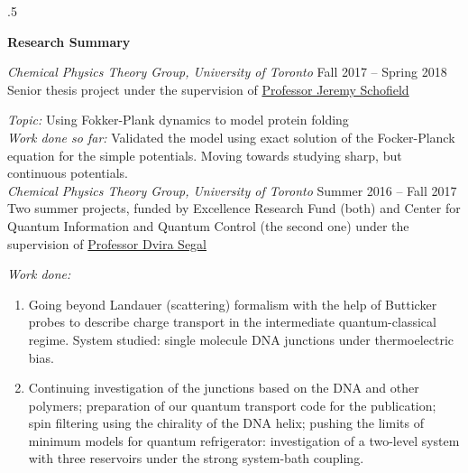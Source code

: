 \documentclass[9pt, margin]{res}
\begin{document}
\moveleft.5\hoffset\centerline{\large\bf Research Summary} %


\begin{resume}

{\sl Chemical Physics Theory Group, University of Toronto}  \hfill Fall 2017 -- Spring 2018 \\
Senior thesis project under the supervision of \href{http://www.chem.utoronto.ca/~jmschofi/}{Professor Jeremy Schofield}

\textit{Topic:} Using Fokker-Plank dynamics to model protein folding\\
\textit{Work done so far:} Validated the model using exact solution of the Focker-Planck equation for the simple potentials. Moving towards studying sharp, but continuous potentials.\\
\newline \newline \newline
{\sl Chemical Physics Theory Group, University of Toronto} \hfill Summer 2016 -- Fall 2017 \\
Two summer projects, funded by Excellence Research Fund (both) and Center for Quantum Information and Quantum Control (the second one) under the supervision of \href{http://www.chem.utoronto.ca/~dsegal/index.html}{Professor Dvira Segal}

\textit{Work done:}

\begin{enumerate}
\item Going beyond Landauer (scattering) formalism with the help of Butticker probes to describe charge transport in the intermediate quantum-classical regime. System studied: single molecule DNA junctions under thermoelectric bias.
\item Continuing investigation of the junctions based on the DNA and other polymers; preparation of our quantum transport code for the publication; spin filtering using the chirality of the DNA helix; pushing the limits of minimum models for quantum refrigerator: investigation of a two-level system with three reservoirs under the strong system-bath coupling. 
\end{enumerate}


\end{resume}
\end{document}
